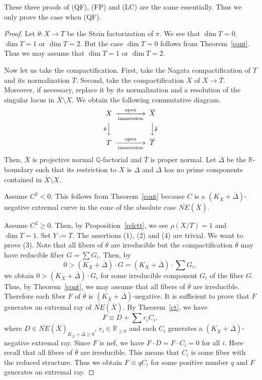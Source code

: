 \documentclass[12pt,twoside]{amsart}
\theoremstyle{definition}
\newcommand{\Q}{$\mathbb{Q}$}
\newcommand{\neb}{\overline{NE}}
\begin{document}
These three proofs of (QF), (FP) and (LC) are the same essentially. 
Thus we only prove the case when (QF). 

\begin{proof}
Let $\theta:X \to T$ be the Stein factorization of $\pi$. 
We see that $\dim T=0$, $\dim T=1$ or $\dim T=2$. 
But the case $\dim T=0$ follows from Theorem~\ref{cont}. 
Thus we may assume that $\dim T=1$ or $\dim T=2$. 

Now let us take the compactification.
First, take the Nagata compactification of $T$ and 
its normalization $\overline{T}$. 
Second, take the compactification $\overline{X}$ of $X \to \overline{T}$. 
Moreover, if necessary, replace it by its normalization 
and a resolution of the singular locus in $\overline{X}\setminus X$. 
We obtain the following commutative diagram. 
$$
\begin{CD}
X @>{\rm open}>{\rm immersion}> \overline{X}\\
@V\theta VV @VV\overline{\theta}V\\
T @>{\rm open}>{\rm immersion}> \overline{T}\\
\end{CD}
$$
Then, $\overline{X}$ is projective normal \Q-factorial and 
$\overline{T}$ is proper normal. 
Let $\overline{\Delta}$ be the $\mathbb{R}$-boundary such that 
its restriction to $X$ is $\Delta$ and $\overline{\Delta}$ 
has no prime components contained in $\overline{X}\setminus X$.

Assume $C^2<0$. 
This follows from Theorem~\ref{cont} because 
$C$ is a $(K_{\overline{X}}+\overline{\Delta})$-negative extremal curve 
in the cone of the absolute case $\overline{NE}(\overline{X})$. 

Assume $C^2\geq 0$. 
Then, by Proposition~\ref{relctt}, we see $\rho(X/T)=1$ and $\dim T=1$. 
Set $Y:=T$. 
The assertions (1), (2) and (4) are trivial. 
We want to prove (3). 
Note that all fibers of $\theta$ are irreducible but 
the compactification $\overline{\theta}$ may have 
reducible fiber $G=\sum G_i$. 
Then, by 
$$0>(K_{\overline{X}}+{\overline{\Delta}})\cdot G=
(K_{\overline{X}}+{\overline{\Delta}})\cdot \sum G_i,$$
we obtain 
$0>(K_{\overline{X}}+{\overline{\Delta}})\cdot G_i$ 
for some irreducible component $G_i$ of the fiber $G$. 
Thus, by Theorem~\ref{cont}, 
we may assume that all fibers of $\overline{\theta}$ are irreducible. 
Therefore each fiber $F$ of $\overline{\theta}$ is 
$(K_{\overline{X}}+{\overline{\Delta}})$-negative. 
It is sufficient to prove that $F$ generates 
an extremal ray of $\overline{NE}(\overline{X})$. 
By Theorem~\ref{ct}, 
we have 
$$F \equiv D +\sum r_iC_i,$$ 
where $D \in \neb(\overline{X})_{K_{\overline{X}}+{\overline{\Delta}} \geq 0}$, 
$r_i\in \mathbb{R}_{\geq 0}$ and 
each $C_i$ generates a 
$(K_{\overline{X}}+{\overline{\Delta}})$-negative extremal ray. 
Since $F$ is nef, we have $F\cdot D=F\cdot C_i=0$ for all $i$. 
Here recall that all fibers of $\overline{\theta}$ are irreducible. 
This means that $C_i$ is some fiber with the reduced structure. 
Thus we obtain $F \equiv qC_i$ for some positive number $q$ 
and $F$ generates an extremal ray. 
\end{proof}
\end{document}
